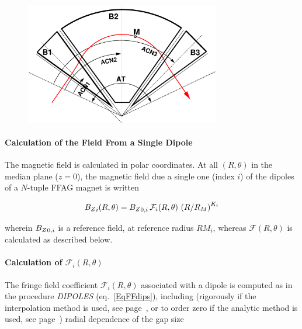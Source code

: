 {\begin{figure}[h]
 \begin{center}
\includegraphics[width=8.5cm]{ffagTriplet.eps}  
{\setlength{\captionwidth}{12cm}
 }
  \end{center}
\end{figure}


\paragraph{Calculation of the Field From a Single Dipole} 

 \noindent The magnetic field is calculated in  polar
coordinates.  At all $(R,\theta)$ in the median plane ($z=0$), the 
magnetic field  due  a single one (index $i$) of the  dipoles  of a $N$-tuple FFAG  magnet is written 

$$ {B_Z}_i(R,\theta) =  {B_Z}_{0,i} \, \mathcal{F}_i(R,\theta) \, \left(   R/R_M \right)^{K_i}  $$

\noindent wherein ${B_Z}_{0,i}$  is a reference field, at reference radius  $RM_{i}$, 
 whereas $ \mathcal{F}(R,\theta)$ is calculated as described below. 



\paragraph{Calculation of $\mathcal{F}_i(R,\theta) $} 

\noindent The fringe field coefficient  $\mathcal{F}_i(R,\theta) $ associated with a  dipole is computed as in the 
procedure  \textsl{DIPOLES} (eq.~\ref{EqFFdips}), including (rigorously if the interpolation method is 
used, see page~\pageref{AnalMeth}, or to  order zero if the analytic method is used, see page~\pageref{InterpMeth}) 
 radial dependence of the gap size 

}
